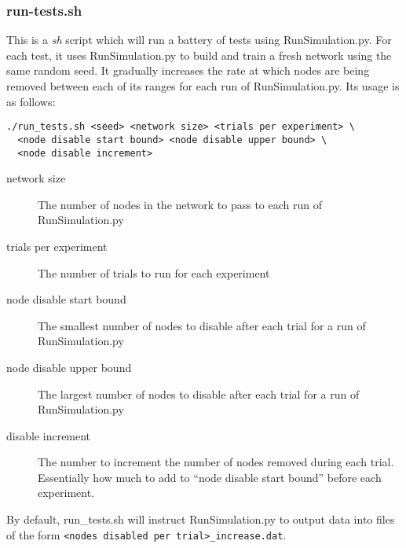 \documentclass[notitlepage,12pt]{article}
\begin{document}
\subsubsection{run-tests.sh}
\label{sec:runtests}
This is a \emph{sh} script which will run a battery of tests using
RunSimulation.py. For each test, it uses RunSimulation.py to build and train a
fresh network using the same random seed. It gradually increases the rate
at which nodes are being removed between each of its ranges for each run of RunSimulation.py. 
Its usage is as follows:

\begin{verbatim}
./run_tests.sh <seed> <network size> <trials per experiment> \
  <node disable start bound> <node disable upper bound> \
  <node disable increment>
\end{verbatim}

\begin{description}
\item[network size] The number of nodes in the network to pass to each run of RunSimulation.py
\item[trials per experiment] The number of trials to run for each experiment
\item[node disable start bound] The smallest number of nodes to disable after
  each trial for a run of RunSimulation.py
\item[node disable upper bound] The largest number of nodes to disable after
  each trial for a run of RunSimulation.py
\item[disable increment] The number to increment the number of nodes removed
  during each trial. Essentially how much to add to ``node disable start bound''
  before each experiment.
\end{description}
By default, run\_tests.sh will instruct RunSimulation.py to output data into
files of the form \texttt{<nodes disabled per trial>\_increase.dat}.
\end{document}
